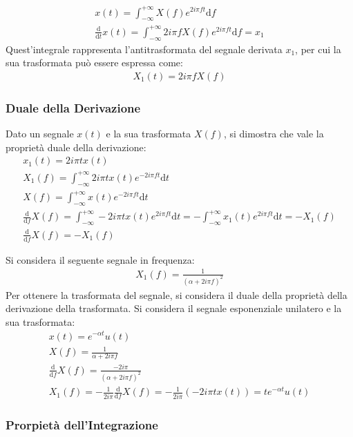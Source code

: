 \documentclass{article}
\newcommand{\df}{\mathrm{d}}
\numberwithin{equation}{subsection}
\begin{document}
\begin{gather*}
    x(t)=\displaystyle\int_{-\infty}^{+\infty}X(f)e^{2i\pi ft}\df f\\
    \displaystyle\frac{\df}{\df t}x(t)=\int_{-\infty}^{+\infty}2i\pi fX(f)e^{2i\pi ft}\df f=x_1
\end{gather*}
Quest'integrale rappresenta l'antitrasformata del segnale derivata $x_1$, per cui la sua trasformata può essere espressa come:
\begin{gather*} 
    X_1(t)=2i\pi fX(f)
\end{gather*}

\subsubsection{Duale della Derivazione}
Dato un segnale $x(t)$ e la sua trasformata $X(f)$, si dimostra che vale la proprietà duale della derivazione: 
\begin{gather*}
    x_1(t)=2i\pi tx(t)\\
    X_1(f)=\displaystyle\int_{-\infty}^{+\infty}2i\pi tx(t)e^{-2i\pi ft}\df t\\
    X(f)=\displaystyle\int_{-\infty}^{+\infty}x(t)e^{-2i\pi ft}\df t\\
    \displaystyle\frac{\df}{\df f}X(f)=\int_{-\infty}^{+\infty}-2i\pi t x(t)e^{2i\pi ft}\df t=-\int_{-\infty}^{+\infty}x_1(t)e^{2i\pi ft}\df t=-X_1(f)\\
    \displaystyle\frac{\df}{\df f}X(f)=-X_1(f)
\end{gather*}


Si considera il seguente segnale in frequenza:
\begin{gather*}
    X_1(f)=\displaystyle\frac{1}{(\alpha+2i\pi f)^2}
\end{gather*}
Per ottenere la trasformata del segnale, si considera il duale della proprietà della derivazione della trasformata. Si considera il segnale esponenziale unilatero e la sua 
trasformata:
\begin{gather*}
    x(t)=e^{-\alpha t}u(t)\\
    X(f)=\displaystyle\frac{1}{\alpha+2i\pi f}\\
    \displaystyle\frac{\df}{\df f}X(f)=\frac{-2i\pi}{(\alpha+2i\pi f)^2}\\
    X_1(f)=\displaystyle-\frac{1}{2i\pi}\frac{\df}{\df f}X(f)=-\frac{1}{2i\pi}(-2i\pi tx(t))=te^{-\alpha t}u(t)
\end{gather*}

\subsubsection{Prorpietà dell'Integrazione}
\end{document}
